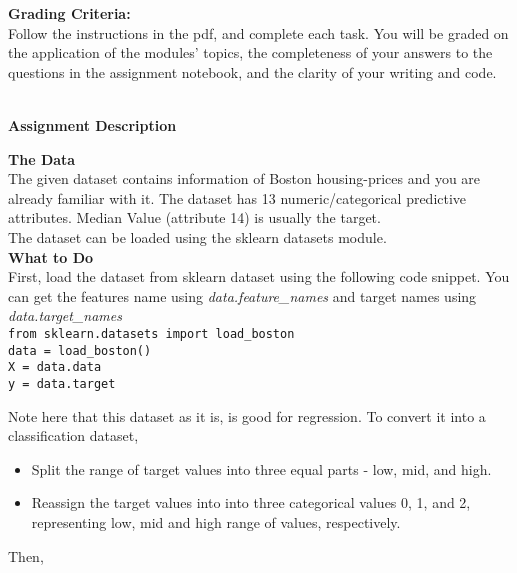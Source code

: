 \documentclass[letter-paper,12pt]{article} %
\begin{document}
\textbf{Grading Criteria:}\\
Follow the instructions in the pdf, and complete each task. You will be graded on the application of the modules’ topics, the completeness of your answers to the questions in the assignment notebook, and the clarity of your writing and code.\\~\\


\newpage

\begin{center}
    \Large \textbf{Assignment Description}
\end{center}

\textbf{The Data}\\
The given dataset contains information of Boston housing-prices and you are already familiar with it. The dataset has 13 numeric/categorical predictive attributes. Median Value (attribute 14) is usually the target.\\
The dataset can be loaded using the sklearn datasets module. \\


\textbf{What to Do}\\
First, load the dataset from sklearn dataset using the following code snippet. You can get the features name using \textit{data.feature\_names} and target names using \textit{data.target\_names}\\

\texttt{from sklearn.datasets import load\_boston\\
data = load\_boston()\\
X = data.data\\
y = data.target\\
}

Note here that this dataset as it is, is good for regression. To convert it into a classification dataset, 
\begin{itemize}
\item Split the range of target values into three equal parts - low, mid, and high.
\item Reassign the target values into into three categorical values 0, 1, and 2, representing low, mid and high range of values, respectively.  
\end{itemize}

Then, 
\end{document}
